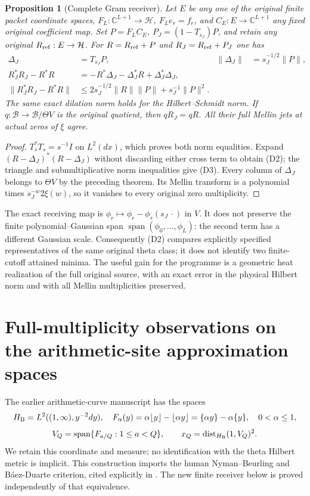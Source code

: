 \documentclass[11pt]{article}
\newtheorem{proposition}[theorem]{Proposition}
\newcommand{\C}{\mathbb C}\newcommand{\R}{\mathbb R}
\newcommand{\B}{\mathscr B}\newcommand{\M}{\mathcal M}
\begin{document}
\begin{proposition}[Complete Gram receiver]\label{prop:dyadic-gram}
Let $E$ be any one of the original finite packet coordinate spaces,
$F_L:\C^{L+1}\to\mathcal H$, $F_Le_r=f_r$, and
$C_E:E\to\C^{L+1}$ any fixed original coefficient map. Set
$P=F_LC_E$, $P_J=(1-T_{s_J})P$, and retain any original
$R_{\rm ref}:E\to\mathcal H$. For $R=R_{\rm ref}+P$ and
$R_J=R_{\rm ref}+P_J$ one has
\begin{align}
 \Delta_J&=T_{s_J}P, & \|\Delta_J\|&=s_J^{-1/2}\|P\|,\nonumber\\
 R_J^*R_J-R^*R
   &=-R^*\Delta_J-\Delta_J^*R+\Delta_J^*\Delta_J,\tag{D2}\\
 \|R_J^*R_J-R^*R\|
   &\leq2s_J^{-1/2}\|R\|\|P\|+s_J^{-1}\|P\|^2.\tag{D3}
\end{align}
The same exact dilation norm holds for the Hilbert--Schmidt norm.
If $q:\B\to\B/\Theta V$ is the original quotient, then
$qR_J=qR$. All their full Mellin jets at actual zeros of $\xi$ agree.
\end{proposition}
\begin{proof}
$T_s^*T_s=s^{-1}I$ on $L^2(dx)$, which proves both norm equalities.
Expand $(R-\Delta_J)^*(R-\Delta_J)$ without discarding either cross term
to obtain (D2); the triangle and submultiplicative norm inequalities
give (D3). Every column of $\Delta_J$ belongs to $\Theta V$ by the
preceding theorem. Its Mellin transform is a polynomial times
$s_J^{-w}2\xi(w)$, so it vanishes to every original zero multiplicity.
\end{proof}

The exact receiving map is
$\phi_r\mapsto\phi_r-\phi_r(s_J\,\cdot)$ in $V$.
It does not preserve the finite polynomial--Gaussian span
$\operatorname{span}(\phi_0,\ldots,\phi_L)$: the second term has a
different Gaussian scale. Consequently (D2) compares explicitly specified
representatives of the same original theta class; it does not identify two
finite-cutoff attained minima. The useful gain for the programme is a
geometric heat realization of the full original source, with an exact error
in the physical Hilbert norm and with all Mellin multiplicities preserved.

\section{Full-multiplicity observations on the arithmetic-site approximation spaces}
The earlier arithmetic-curve manuscript has the spaces
\[
 H_{\rm B}=L^2((1,\infty),y^{-2}dy),\quad
 F_\alpha(y)=\alpha\lfloor y\rfloor-\lfloor\alpha y\rfloor
            =\{\alpha y\}-\alpha\{y\},\quad 0<\alpha\leq1,
\]
\[
 V_Q=\operatorname{span}\{F_{a/Q}:1\leq a<Q\},\qquad
 x_Q=\operatorname{dist}_{H_{\rm B}}(1,V_Q)^2.
\]
We retain this coordinate and measure; no identification with the theta
Hilbert metric is implicit. This construction imports the human
Nyman--Beurling and B\'aez-Duarte criterion, cited explicitly in
\cite{Beurling,BD}. The new finite receiver below is proved independently
of that equivalence.
\end{document}
